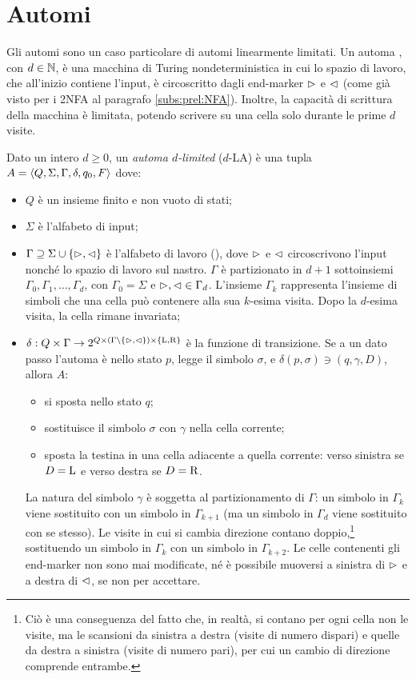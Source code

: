 \section{Automi }
Gli automi  sono un caso particolare di automi linearmente limitati. Un automa , con $d\in\mathbb N$, è una macchina di Turing nondeterministica in cui lo spazio di lavoro, che all'inizio contiene l'input, è circoscritto dagli end-marker $\rhd$ e $\lhd$ (come già visto per i 2NFA al paragrafo \ref{subs:prel:NFA}). Inoltre, la capacità di scrittura della macchina è limitata, potendo scrivere su una cella solo durante le prime $d$ visite.
\begin{defin}
	Dato un intero $d\geq 0$, un \emph{automa $d$-limited} ($d$-LA) è una tupla $A=\langle Q,\Sigma,\Gamma,\delta,q_0,F \rangle$ dove:
	\begin{itemize}
		\item $Q$ è un insieme finito e non vuoto di stati;
		\item $\Sigma$ è l'alfabeto di input;
		\item $\Gamma\supseteq\Sigma\cup\left\{ \rhd,\lhd \right\}$ è l'alfabeto di lavoro (), dove $\rhd$ e $\lhd$ circoscrivono l'input nonché lo spazio di lavoro sul nastro. $\Gamma$ è partizionato in $d+1$ sottoinsiemi $\Gamma_0,\Gamma_1,\dots,\Gamma_d$, con $\Gamma_0=\Sigma$ e $\rhd,\lhd\in\Gamma_d$. L'insieme $\Gamma_k$ rappresenta l'insieme di simboli che una cella può contenere alla sua $k$-esima visita. Dopo la $d$-esima visita, la cella rimane invariata;
		\item $\delta:Q\times\Gamma\to 2^{Q\times(\Gamma\setminus\left\{ \rhd,\lhd \right\})\times\left\{ \mathrm L,\mathrm R \right\}}$ è la funzione di transizione. Se a un dato passo l'automa è nello stato $p$, legge il simbolo $\sigma$, e $\delta(p,\sigma)\ni (q,\gamma,D)$, allora $A$:
		      \begin{itemize}
			      \item si sposta nello stato $q$;
			      \item sostituisce il simbolo $\sigma$ con $\gamma$ nella cella corrente;
			      \item sposta la testina in una cella adiacente a quella corrente: verso sinistra se $D=\mathrm L$ e verso destra se $D=\mathrm R$.
		      \end{itemize}
		      La natura del simbolo $\gamma$ è soggetta al partizionamento di $\Gamma$: un simbolo in $\Gamma_k$ viene sostituito con un simbolo in $\Gamma_{k+1}$ (ma un simbolo in $\Gamma_d$ viene sostituito con se stesso). Le visite in cui si cambia direzione contano doppio,\footnote{Ciò è una conseguenza del fatto che, in realtà, si contano per ogni cella non le visite, ma le scansioni da sinistra a destra (visite di numero dispari) e quelle da destra a sinistra (visite di numero pari), per cui un cambio di direzione comprende entrambe.} sostituendo un simbolo in $\Gamma_k$ con un simbolo in $\Gamma_{k+2}$. Le celle contenenti gli end-marker non sono mai modificate, né è possibile muoversi a sinistra di $\rhd$ e a destra di $\lhd$, se non per accettare.

\end{itemize}
\end{defin}
